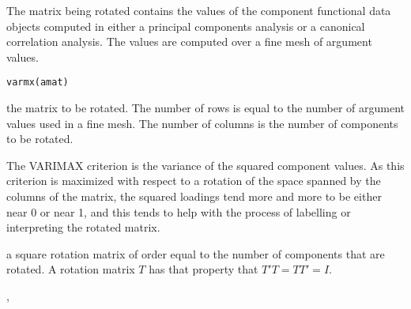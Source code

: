 \begin{Description}\relax
The matrix being rotated contains the values of the component
functional data objects computed in either a principal
components analysis or a canonical correlation analysis.
The values are computed over a fine mesh of argument values.
\end{Description}
\begin{Usage}
\begin{verbatim}
varmx(amat)
\end{verbatim}
\end{Usage}
\begin{Arguments}
\begin{ldescription}
\item[\code{amat}] the matrix to be rotated.  The number of rows is
equal to the number of argument values  used
in a fine mesh.  The number of columns is the number of
components to be rotated.

\end{ldescription}
\end{Arguments}
\begin{Details}\relax
The VARIMAX criterion is the variance of the squared component values.
As this criterion is maximized with respect to a rotation of the
space spanned by the columns of the matrix, the squared loadings
tend more and more to be either near 0 or near 1, and this tends to
help with the process of labelling or interpreting the rotated matrix.
\end{Details}
\begin{Value}
a square rotation matrix of order equal to the number
of components that are rotated.  A rotation matrix
$T$ has that property that $T'T = TT' = I$.
\end{Value}
\begin{SeeAlso}\relax
{}, 
\end{SeeAlso}

